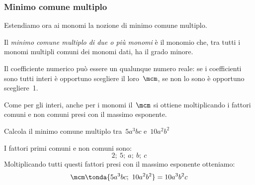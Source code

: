 \subsubsection{Minimo comune multiplo}

Estendiamo ora ai monomi la nozione di minimo comune multiplo.

\begin{definizione}
 Il \emph{minimo comune multiplo di due o più monomi}
è il monomio che, tra tutti i monomi multipli comuni dei monomi dati,
ha il grado minore.
\end{definizione}

Il coefficiente numerico può essere un qualunque numero reale: se i
coefficienti sono tutti interi è opportuno scegliere il loro~$\mcm$,
se non lo sono è opportuno scegliere~1.

Come per gli interi, anche per i monomi il~$\mcm$ si ottiene moltiplicando 
i fattori comuni e non comuni presi con il massimo esponente.

\begin{exrig}
 \begin{esempio}
Calcola il minimo comune multiplo tra~$5a^{3}bc$ e~$10a^{2}b^{2}$ 

I fattori primi comuni e non comuni sono:
\[2;~5;~a;~b;~c\]
Moltiplicando tutti questi fattori presi con il massimo esponente otteniamo:
\[\mcm\tonda{5a^{3}bc;~10a^{2}b^{2}} = 10a^{3}b^{2}c\]
 \end{esempio}
\end{exrig}

% 
% 

